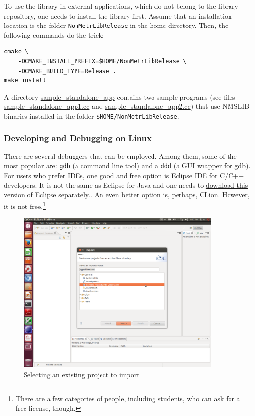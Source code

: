 \documentclass[runningheads,a4paper]{llncs}
\newcommand{\replocfile}{https://github.com/searchivarius/nmslib/blob/v1.5/}
\newcommand{\ttt}[1]{\texttt{#1}}
\begin{document}
{To use the library in external applications, which do not belong to the library repository,
one needs to install the library first.
Assume that an installation location is the folder \ttt{NonMetrLibRelease} in the
home directory. Then, the following commands do the trick:
\begin{verbatim}
cmake \
    -DCMAKE_INSTALL_PREFIX=$HOME/NonMetrLibRelease \
    -DCMAKE_BUILD_TYPE=Release .
make install
\end{verbatim}

A directory \href{\replocfile sample_standalone_app}{sample\_standalone\_app} 
contains two sample programs (see files 
\href{\replocfile sample_standalone_app/sample_standalone_app1.cc}{sample\_standalone\_app1.cc}
and
\href{\replocfile sample_standalone_app/sample_standalone_app2.cc}{sample\_standalone\_app2.cc})
that use NMSLIB binaries installed in the folder \ttt{\$HOME/NonMetrLibRelease}.

\subsubsection{Developing and Debugging on Linux}
There are several debuggers that can be employed.
Among them, some of the most popular are: \ttt{gdb} (a command line tool)
and a \ttt{ddd} (a GUI wrapper for gdb).
For users who prefer IDEs, one good and free option is Eclipse IDE for C/C++ developers.
It is not the same as Eclipse for Java and one needs 
to \href{http://www.eclipse.org/ide/}{download 
this version of Eclipse separately.}.
An even better option is, perhaps, \href{https://www.jetbrains.com/clion/}{CLion}. However, it is not free.\footnote{There are
a few categories of people, including students, who can ask for a free license, though.}

\begin{figure}
\centering
\caption{\label{FigEclipse1}Selecting an existing project to import}
\includegraphics[width=0.9\textwidth]{figures/Eclipse1.pdf}
\end{figure}

}
\end{document}
